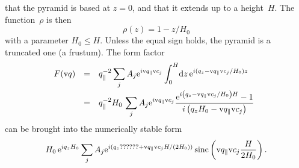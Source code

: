 that the pyramid is based at $z=0$, and that it extends up to a height~$H$.
The function~$\rho$ is then
\begin{equation}
  \rho(z) = 1-z/H_0
\end{equation}
with a parameter $H_0\le H$.
Unless the equal sign holds,
the pyramid is a truncated one (a frustum).
The form factor
\begin{equation}
  \begin{array}{@{}lcl}
  F(\q)
  &=& \displaystyle
      q_\parallel^{-2}  \sum_j A_j \e^{i\q_\parallel \v{c}_j}
      \int_0^H\!\d z\,\e^{i(q_z-\q_\parallel \v{c}_j/H_0)z}
\\[3ex]
  &=& \displaystyle
       q_\parallel^{-2} H_0\, \sum_j A_j  \e^{i\q_\parallel \v{c}_j}
          \frac{\e^{i\left(q_z-\q_\parallel\v{c}_j/H_0\right)H}-1}
               {i\left(q_z H_0 - \q_\parallel\v{c}_j\right)}
  \end{array}
\end{equation}
can be brought into the numerically stable form
\begin{equation}
         H_0\, \text{e}^{iq_z H_0} \sum_j A_j \text{e}^{i(q_z ?????? + \text{v}{q}_\parallel\text{v}{c}_jH/(2H_0))}
          \operatorname{sinc}\left(\text{v}{q}_\parallel\text{v}{c}_j\frac{H}{2H_0}\right).
\end{equation}
%
%
%
%

\iffalse
\section{Special functions near the removable singularity}

\index{Machine epsilon}
We assume a double-precision machine epsilon
of $\epsilon=2^{-52}\simeq2.2\cdot10^{-16}$.

\fi

